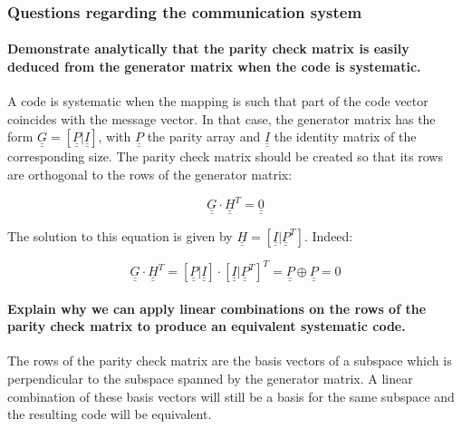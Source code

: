 \subsubsection{Questions regarding the communication system}

\paragraph{Demonstrate analytically that the parity check matrix is easily deduced from the generator matrix when the code is systematic.} \mbox{}

A code is systematic when the mapping is such that part of the code vector coincides with the message vector. In that case, the generator matrix has the form $\underline{\underline{G}} = \left[\underline{\underline{P}} | \underline{\underline{I}}\right]$, with $\underline{\underline{P}}$ the parity array and $\underline{\underline{I}}$ the identity matrix of the corresponding size.
The parity check matrix should be created so that its rows are orthogonal to the rows of the generator matrix:

\begin{equation*}
 \underline{\underline{G}} \cdot \underline{\underline{H}}^T = \underline{\underline{0}}
\end{equation*}

The solution to this equation is given by $\underline{\underline{H}} = \left[\underline{\underline{I}} | \underline{\underline{P}}^T\right]$. Indeed:

\begin{equation*}
	\underline{\underline{G}} \cdot \underline{\underline{H}}^T = \left[\underline{\underline{P}} | \underline{\underline{I}}\right] \cdot \left[\underline{\underline{I}} | \underline{\underline{P}}^T\right]^T =  \underline{\underline{P}} \oplus  \underline{\underline{P}} =0
\end{equation*}

\paragraph{Explain why we can apply linear combinations on the rows of the parity check matrix to produce an equivalent systematic code.} \mbox{}

The rows of the parity check matrix are the basis vectors of a subspace which is perpendicular to the subspace spanned by the generator matrix. A linear combination of these basis vectors will still be a basis for the same subspace and the resulting code will be equivalent.

